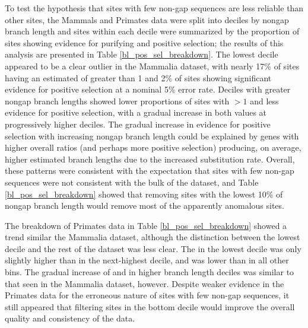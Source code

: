 To test the hypothesis that sites with few non-gap sequences are less
reliable than other sites, the Mammals and Primates data were split
into deciles by nongap branch length and sites within each decile were
summarized by the proportion of sites showing evidence for purifying
and positive selection; the results of this analysis are presented in
Table \ref{bl_pos_sel_breakdown}. The lowest decile appeared to be a
clear outlier in the Mammalia dataset, with nearly 17\% of sites
having an estimated \omg of greater than 1 and 2\% of sites showing
significant evidence for positive selection at a nominal 5\% error
rate. Deciles with greater nongap branch lengths showed lower
proportions of sites with \omg $> 1$ and less evidence for positive
selection, with a gradual increase in both values at progressively
higher deciles. The gradual increase in evidence for positive
selection with increasing nongap branch length could be explained by
genes with higher overall \dnds ratios (and perhaps more positive
selection) producing, on average, higher estimated branch lengths due
to the increased \nsyn substitution rate. Overall, these patterns were
consistent with the expectation that sites with few non-gap sequences
were not consistent with the bulk of the dataset, and Table
\ref{bl_pos_sel_breakdown} showed that removing sites with the lowest
10\% of nongap branch length would remove most of the apparently
anomalous sites.

The breakdown of Primates data in Table \ref{bl_pos_sel_breakdown}
showed a trend similar the Mammalia dataset, although the distinction
between the lowest decile and the rest of the dataset was less
clear. The \fpos in the lowest decile was only slightly higher than in
the next-highest decile, and \fblw was lower than in all other
bins. The gradual increase of \fabv and \fpos in higher branch length
deciles was similar to that seen in the Mammalia dataset,
however. Despite weaker evidence in the Primates data for the
erroneous nature of sites with few non-gap sequences, it still
appeared that filtering sites in the bottom decile would improve the
overall quality and consistency of the data.

